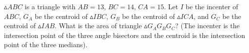 $\vartriangle ABC$ is a triangle with $AB = 13$, $BC = 14$, $CA = 15$. Let $I$ be the incenter of $ABC$, $G_A$ be the centroid of  $\vartriangle IBC$, $G_B$ be the centroid of  $\vartriangle ICA$, and $G_C$ be the centroid of  $\vartriangle IAB$. What is the area of triangle  $\vartriangle G_AG_BG_C$? (The incenter is the intersection point of the three angle bisectors and the centroid is the intersection point of the three medians).
